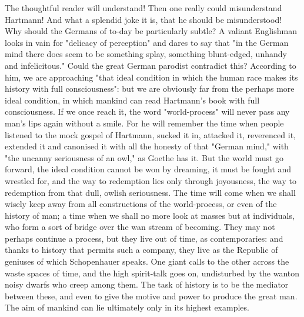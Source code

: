 The thoughtful reader will understand! Then one really could
misunderstand Hartmann! And what a splendid joke it is, that he
should be misunderstood! Why should the Germans of to-day be
particularly subtle? A valiant Englishman looks in vain for "delicacy
of perception" and dares to say that "in the German mind there does
seem to be something splay, something blunt-edged, unhandy and
infelicitous." Could the great German parodist contradict this?
According to him, we are approaching "that ideal condition in which
the human race makes its history with full consciousness": but we are
obviously far from the perhaps more ideal condition, in which mankind
can read Hartmann's book with full consciousness. If we once reach
it, the word "world-process" will never pass any man's lips again
without a smile. For he will remember the time when people listened
to the mock gospel of Hartmann, sucked it in, attacked it, reverenced
it, extended it and canonised it with all the honesty of that "German
mind," with "the uncanny seriousness of an owl," as Goethe has it.
But the world must go forward, the ideal condition cannot be won by
dreaming, it must be fought and wrestled for, and the way to
redemption lies only through joyousness, the way to redemption from
that dull, owlish seriousness. The time will come when we shall
wisely keep away from all constructions of the world-process, or even
of the history of man; a time when we shall no more look at masses
but at individuals, who form a sort of bridge over the wan stream of
becoming. They may not perhaps continue a process, but they live out
of time, as contemporaries: and thanks to history that permits such a
company, they live as the Republic of geniuses of which Schopenhauer
speaks. One giant calls to the other across the waste spaces of time,
and the high spirit-talk goes on, undisturbed by the wanton noisy
dwarfs who creep among them. The task of history is to be the
mediator between these, and even to give the motive and power to
produce the great man. The aim of mankind can lie ultimately only in
its highest examples.

